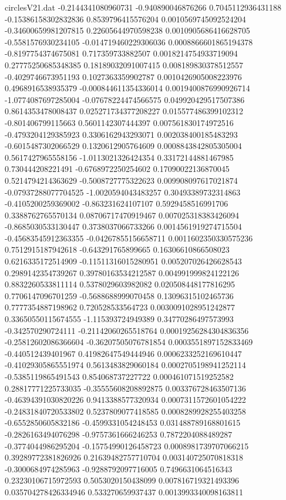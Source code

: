 \begin{filecontents}{circlesV21.dat}
-0.2144341080960731	-0.940890046876266	0.7045112936431188
-0.15386158302832836	0.8539796415576204	0.0010569745092524204
-0.34600659981207815	0.22605644970598238	0.0010905686416628705
-0.5581576930234105	-0.014719460229306036	0.0008866601865194378
-0.8197754374675081	0.717359733882507	0.0018214754933719094
0.27775250685348385	0.18189032091007415	0.008189830378512557
-0.4029746673951193	0.1027363359902787	0.0010426905008223976
0.4968916538935379	-0.000844611354336014	0.0019400876990926714
-1.0774087697285004	-0.07678224474566575	0.049920429517507386
0.8614353478008437	0.025271734377208227	0.015577486399102312
-0.801406799115663	0.5601142307444397	0.007561830174972516
-0.4793204129385923	0.3306162943293071	0.002038400185483293
-0.6015487302066529	0.1320612905764609	0.0008843842805305004
0.5617427965558156	-1.0113021326424354	0.33172144881467985
0.730444208221491	-0.6768972250254602	0.17090022136870045
0.5214794214363629	-0.5008727775322623	0.009908097617021874
-0.07937288077704525	-1.0020594043483257	0.30493389732314863
-0.4105200259369002	-0.863231624107107	0.5929458516991706
0.3388762765570134	0.08706717470919467	0.007025318383426094
-0.8685030533130447	0.3738037066733266	0.0014561919274715504
-0.45683545912363355	-0.04267855156658711	0.0011602350330575236
0.7512915187942618	-0.643291765899665	0.16306610866508023
0.6216335172514909	-0.11511316015280951	0.005207026426628543
0.2989142354739267	0.39780163534212587	0.004991999824122126
0.8832260533811114	0.5378029603982082	0.020508448177816295
0.7706147096701259	-0.5688688999070458	0.13096315102465736
0.7777354887198962	0.720528533564723	0.0030091028951242877
0.33650550115674555	-1.115393724949389	0.34770286497573993
-0.342570290724111	-0.21142060265518764	0.00019256284304836356
-0.25812602086366604	-0.36207505076781854	0.0003551897152833469
-0.440512439401967	0.41982647549444946	0.0006233252169610447
-0.41029305865551974	0.5613483829060184	0.0002705198941252114
-0.5385119865491543	0.854068737227722	0.000461071519252582
0.28817771225733035	-0.35555608208892875	0.003376728463507136
-0.46394391030820226	0.9413388577320934	0.0007311572601054222
-0.24831840720533802	0.5237809077418585	0.0008289928255403258
-0.6552850605832186	-0.4599331054248453	0.031488789168801615
-0.2826163494076298	-0.9757361666246253	0.7872204088489287
-0.3774044986295204	-0.15754990126458723	0.0008981739707066215
0.39289772381826926	0.21639482757710704	0.003140725070818318
-0.3000684974285963	-0.9288792097716005	0.7496631064516343
0.23230106715972593	0.5053020150438099	0.007816719321493396
0.035704278426334946	0.533270659937437	0.0013993340098163811

\end{filecontents}
